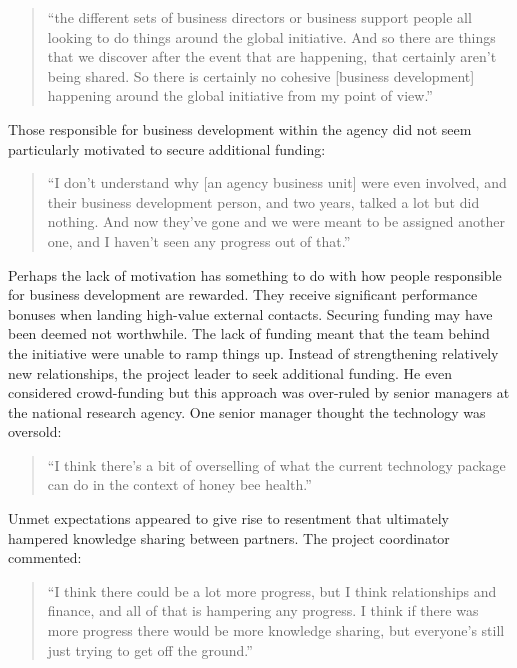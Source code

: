 \begin{quote}
\small
\enquote{the different sets of business directors or business support people all looking to do things around the global initiative. And so there are things that we discover after the event that are happening, that certainly aren't being shared. So there is certainly no cohesive [business development] happening around the global initiative from my point of view.} \\
\end{quote}

Those responsible for business development within the agency did not seem particularly motivated to secure additional funding:

\begin{quote}
\small
\enquote{I don't understand why [an agency business unit] were even involved, and their business development person, and two years, talked a lot but did nothing. And now they've gone and we were meant to be assigned another one, and I haven't seen any progress out of that.} \\
\end{quote}
 
Perhaps the lack of motivation has something to do with how people responsible for business development are rewarded. They receive significant performance bonuses when landing high-value external contacts. Securing funding may have been deemed not worthwhile. The lack of funding meant that the team behind the initiative were unable to ramp things up. Instead of strengthening relatively new relationships, the project leader to seek additional funding. He even considered crowd-funding but this approach was over-ruled by senior managers at the national research agency. One senior manager thought the technology was oversold:

 \begin{quote}
\small
\enquote{I think there’s a bit of overselling of what the current technology package can do in the context of honey bee health.} \\
\end{quote}
 
 Unmet expectations appeared to give rise to resentment that ultimately hampered knowledge sharing between partners. The project coordinator commented:

\begin{quote}
\small
\enquote{I think there could be a lot more progress, but I think relationships and finance, and all of that is hampering any progress. I think if there was more progress there would be more knowledge sharing, but everyone's still just trying to get off the ground.} \\
\end{quote}

